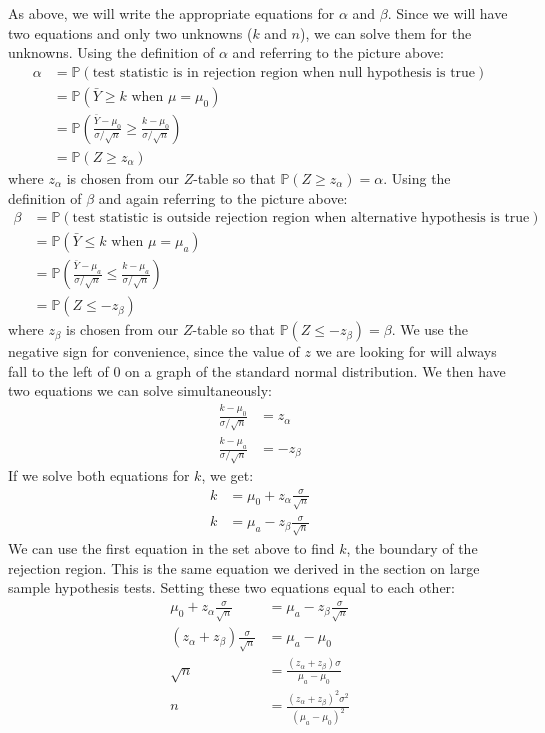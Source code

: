 \documentclass[12pt]{article}
\theoremstyle{definition}
\theoremstyle{remark}
\def\P{{\mathbb P}}
\begin{document}
As above, we will write the appropriate equations for $\alpha$ and $\beta$. Since we will have two equations and only two unknowns ($k$ and $n$), we can solve them for the unknowns. Using the definition of $\alpha$ and referring to the picture above:
\begin{align*}
\alpha &= \P( \text{test statistic is in rejection region when null hypothesis is true} )\\
&= \P( \bar{Y} \geq k \text{ when } \mu = \mu_0  ) \\
&= \P\left( \frac{ \bar{Y} - \mu_0}{ \sigma / \sqrt{n} } \geq  \frac{ k - \mu_0}{ \sigma / \sqrt{n} } \right) \\
&= \P(Z \geq z_\alpha )
\end{align*}
where $z_\alpha$ is chosen from our $Z$-table so that $\P(Z \geq z_\alpha) = \alpha$. Using the definition of $\beta$ and again referring to the picture above:
\begin{align*}
\beta &= \P( \text{test statistic is outside rejection region when alternative hypothesis is true} )\\
&= \P( \bar{Y} \leq k \text{ when } \mu = \mu_a ) \\
&= \P\left( \frac{ \bar{Y} - \mu_a}{ \sigma / \sqrt{n} } \leq  \frac{ k - \mu_a}{ \sigma / \sqrt{n} } \right) \\
&= \P(Z \leq -z_\beta )
\end{align*}
where $z_\beta$ is chosen from our $Z$-table so that $\P(Z \leq -z_\beta) = \beta$. We use the negative sign for convenience, since the value of $z$ we are looking for will always fall to the left of 0 on a graph of the standard normal distribution. We then have two equations we can solve simultaneously:
\begin{align*}
\frac{ k - \mu_0}{ \sigma / \sqrt{n} } &= z_\alpha \\
\frac{ k - \mu_a}{ \sigma / \sqrt{n} } &= -z_\beta
\end{align*}
If we solve both equations for $k$, we get:
\begin{align*}
k &= \mu_0 + z_\alpha \frac{\sigma}{\sqrt{n}} \\
k &= \mu_a - z_\beta \frac{\sigma}{\sqrt{n}} 
\end{align*}
We can use the first equation in the set above to find $k$, the boundary of the rejection region. This is the same equation we derived in the section on large sample hypothesis tests. Setting these two equations equal to each other:
\begin{align*}
\mu_0 + z_\alpha \frac{\sigma}{\sqrt{n}} &= \mu_a - z_\beta \frac{\sigma}{\sqrt{n}} \\
(z_\alpha + z_\beta)\frac{\sigma}{\sqrt{n}} &= \mu_a - \mu_0 \\
\sqrt{n} &= \frac{(z_\alpha + z_\beta)\sigma}{\mu_a - \mu_0 }\\
n &= \frac{(z_\alpha + z_\beta)^2\sigma^2}{(\mu_a - \mu_0)^2 }
\end{align*}
\end{document}
